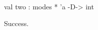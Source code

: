 \chklistingtrue
{}
\begin{ChkListingMsg}
val two : modes * 'a -D-> int 
\end{ChkListingMsg}
\begin{ChkListingErr}
Success.
\end{ChkListingErr}
